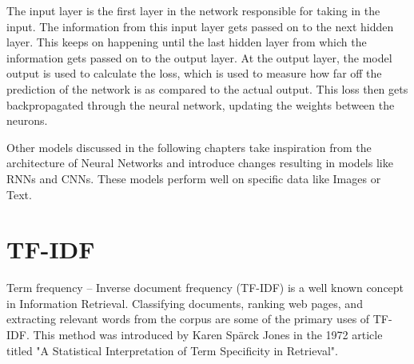 The input layer is the first layer in the network responsible for taking in the input. The information from this input layer gets passed on to the next hidden layer. This keeps on happening until the last hidden layer from which the information gets passed on to the output layer. At the output layer, the model output is used to calculate the loss, which is used to measure how far off the prediction of the network is as compared to the actual output. This loss then gets backpropagated through the neural network, updating the weights between the neurons. 

Other models discussed in the following chapters take inspiration from the architecture of Neural Networks and introduce changes resulting in models like RNNs and CNNs. These models perform well on specific data like Images or Text.






\section{TF-IDF}

Term frequency – Inverse document frequency (TF-IDF) is a well known concept in Information Retrieval. Classifying documents, ranking web pages, and extracting relevant words from the corpus are some of the primary uses of TF-IDF. This method was introduced by Karen Spärck Jones in the 1972 article titled "A Statistical Interpretation of Term Specificity in Retrieval"\cite{kjones_tfidf}. 

